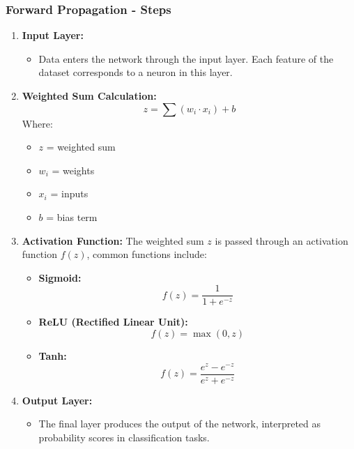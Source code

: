 \documentclass[aspectratio=169]{beamer}
\begin{document}
\begin{frame}[fragile]
    \frametitle{Forward Propagation - Steps}
    \begin{enumerate}
        \item \textbf{Input Layer:}
        \begin{itemize}
            \item Data enters the network through the input layer. Each feature of the dataset corresponds to a neuron in this layer.
        \end{itemize}
        
        \item \textbf{Weighted Sum Calculation:}
        \begin{equation}
            z = \sum (w_i \cdot x_i) + b
        \end{equation}
        Where:
        \begin{itemize}
            \item \( z \) = weighted sum
            \item \( w_i \) = weights
            \item \( x_i \) = inputs
            \item \( b \) = bias term
        \end{itemize}
        
        \item \textbf{Activation Function:}
        The weighted sum \( z \) is passed through an activation function \( f(z) \), common functions include:
        \begin{itemize}
            \item \textbf{Sigmoid:} 
            \begin{equation}
                f(z) = \frac{1}{1 + e^{-z}}
            \end{equation}
            \item \textbf{ReLU (Rectified Linear Unit):} 
            \begin{equation}
                f(z) = \max(0, z)
            \end{equation}
            \item \textbf{Tanh:} 
            \begin{equation}
                f(z) = \frac{e^z - e^{-z}}{e^z + e^{-z}}
            \end{equation}
        \end{itemize}

        \item \textbf{Output Layer:}
        \begin{itemize}
            \item The final layer produces the output of the network, interpreted as probability scores in classification tasks.
        \end{itemize}
    \end{enumerate}
\end{frame}
\end{document}
